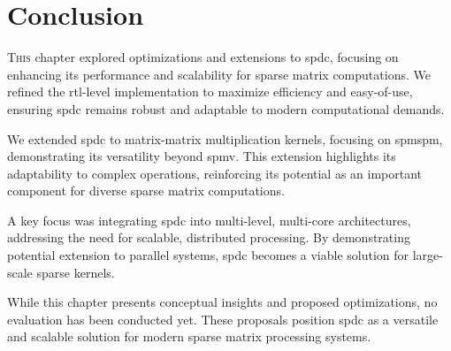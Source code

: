 
\section{Conclusion}
\label{sec:optim:conclu}

\lettrine{T}{his} chapter explored optimizations and extensions to \acrlong{spdc}, focusing on enhancing its performance and scalability for sparse matrix computations.
We refined the \acrshort{rtl}-level implementation to maximize efficiency and easy-of-use, ensuring \acrlong{spdc} remains robust and adaptable to modern computational demands.

We extended \acrlong{spdc} to matrix-matrix multiplication kernels, focusing on \acrshort{spmspm}, demonstrating its versatility beyond \acrshort{spmv}.
This extension highlights its adaptability to complex operations, reinforcing its potential as an important component for diverse sparse matrix computations.

A key focus was integrating \acrlong{spdc} into multi-level, multi-core architectures, addressing the need for scalable, distributed processing.
By demonstrating potential extension to parallel systems, \acrlong{spdc} becomes a viable solution for large-scale sparse kernels.

While this chapter presents conceptual insights and proposed optimizations, no evaluation has been conducted yet.
These proposals position \acrlong{spdc} as a versatile and scalable solution for modern sparse matrix processing systems.

\bigskip\bigskip

